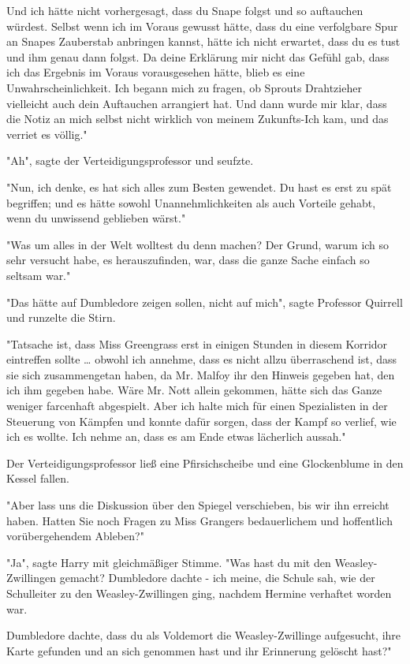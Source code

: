 {Und ich hätte nicht vorhergesagt, dass du Snape folgst und so auftauchen würdest. Selbst wenn ich im Voraus gewusst hätte, dass du eine verfolgbare Spur an Snapes Zauberstab anbringen kannst, hätte ich nicht erwartet, dass du es tust und ihm genau dann folgst. Da deine Erklärung mir nicht das Gefühl gab, dass ich das Ergebnis im Voraus vorausgesehen hätte, blieb es eine Unwahrscheinlichkeit. Ich begann mich zu fragen, ob Sprouts Drahtzieher vielleicht auch dein Auftauchen arrangiert hat. Und dann wurde mir klar, dass die Notiz an mich selbst nicht wirklich von meinem Zukunfts-Ich kam, und das verriet es völlig."

"Ah", sagte der Verteidigungsprofessor und seufzte.

"Nun, ich denke, es hat sich alles zum Besten gewendet. Du hast es erst zu spät begriffen; und es hätte sowohl Unannehmlichkeiten als auch Vorteile gehabt, wenn du unwissend geblieben wärst."

"Was um alles in der Welt wolltest du denn machen? Der Grund, warum ich so sehr versucht habe, es herauszufinden, war, dass die ganze Sache einfach so seltsam war."

"Das hätte auf Dumbledore zeigen sollen, nicht auf mich", sagte Professor Quirrell und runzelte die Stirn.

"Tatsache ist, dass Miss Greengrass erst in einigen Stunden in diesem Korridor eintreffen sollte … obwohl ich annehme, dass es nicht allzu überraschend ist, dass sie sich zusammengetan haben, da Mr. Malfoy ihr den Hinweis gegeben hat, den ich ihm gegeben habe. Wäre Mr. Nott allein gekommen, hätte sich das Ganze weniger farcenhaft abgespielt. Aber ich halte mich für einen Spezialisten in der Steuerung von Kämpfen und konnte dafür sorgen, dass der Kampf so verlief, wie ich es wollte. Ich nehme an, dass es am Ende etwas lächerlich aussah."

Der Verteidigungsprofessor ließ eine Pfirsichscheibe und eine Glockenblume in den Kessel fallen.

"Aber lass uns die Diskussion über den Spiegel verschieben, bis wir ihn erreicht haben. Hatten Sie noch Fragen zu Miss Grangers bedauerlichem und hoffentlich vorübergehendem Ableben?"

"Ja", sagte Harry mit gleichmäßiger Stimme. "Was hast du mit den Weasley-Zwillingen gemacht? Dumbledore dachte - ich meine, die Schule sah, wie der Schulleiter zu den Weasley-Zwillingen ging, nachdem Hermine verhaftet worden war.

Dumbledore dachte, dass du als Voldemort die Weasley-Zwillinge aufgesucht, ihre Karte gefunden und an sich genommen hast und ihr Erinnerung gelöscht hast?"

}
